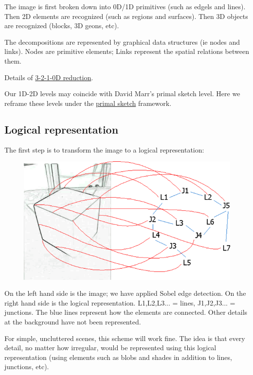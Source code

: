 The image is first broken down into 0D/1D primitives (such as edgels and lines). Then 2D elements are recognized (such as regions and surfaces). Then 3D objects are recognized (blocks, 3D geons, etc).

The decompositions are represented by graphical data structures (ie nodes and links). Nodes are primitive elements; Links represent the spatial relations between them.

Details of \href{Vis-3210D-Reduction.htm}{3-2-1-0D reduction}.

Our 1D-2D levels may coincide with David Marr's primal sketch level. Here we reframe these levels under the \href{Vis-PrimalSketch.htm}{primal sketch} framework.

\subsection{Logical representation}

The first step is to transform the image to a logical representation:

\begin{figure}[H]
\centering
\includegraphics[scale=0.8]{VisioLogicalTransform.png}
\end{figure}

On the left hand side is the image; we have applied  Sobel edge detection. On the right hand side is the logical representation. L1,L2,L3... = lines, J1,J2,J3... = junctions. The blue lines represent how the elements are connected. Other details at the background have not been represented.

For simple, uncluttered scenes, this scheme will work fine. The idea is that every detail, no matter how irregular, would be represented using this logical representation (using elements such as blobs and shades in addition to lines, junctions, etc).

